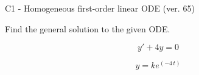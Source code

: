 \begin{exercise}
  \begin{exerciseTitle}C1 - Homogeneous first-order linear ODE (ver. 65)\end{exerciseTitle}
  \begin{exerciseStatement}
    
Find the general solution to the given ODE.

    
\[y'+4y=0\]

  \end{exerciseStatement}
  \begin{exerciseAnswer}
    
\[y= k e^{\left(-4 \, t\right)}\]

  \end{exerciseAnswer}
\end{exercise}